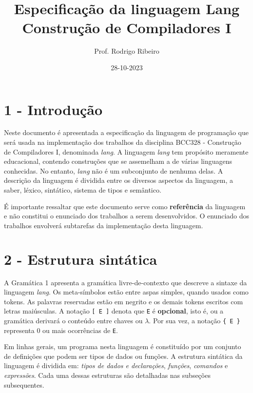 \documentclass[a4paper,11pt]{article}
\author{Prof. Rodrigo Ribeiro}
\date{28-10-2023}
\title{Especificação da linguagem Lang\\\medskip
\large Construção de Compiladores I}
\begin{document}
\maketitle
\newcommand{\lang}{$lang$}
\newcommand{\disciplina}{BCC328 - Construção de Compiladores I}
\section*{1 - Introdução}
\label{sec:orgea41eeb}

Neste documento é apresentada a especificação da linguagem de programação que será usada na
implementação dos trabalhos da disciplina \disciplina, denominada \emph{lang}.
A linguagem \emph{lang} tem
propósito meramente educacional, contendo construções que se assemelham a de várias linguagens
conhecidas. No entanto, \emph{lang} não é um subconjunto de nenhuma delas. A descrição da linguagem é
dividida entre os diversos aspectos da linguagem, a saber, léxico, sintático, sistema de tipos e
semântico.

É importante ressaltar que este documento serve como \textbf{referência} da linguagem e não constitui o
enunciado dos trabalhos a serem desenvolvidos. O enunciado dos trabalhos envolverá subtarefas
da implementação desta linguagem.
\section*{2 - Estrutura sintática}
\label{sec:org98c7b20}

A Gramática 1 apresenta a gramática livre-de-contexto que descreve a sintaxe da linguagem
\emph{lang}. Os meta-símbolos estão entre aspas simples, quando usados como tokens.
As palavras reservadas estão em negrito e os demais tokens escritos com letras maiúsculas. A notação
\texttt{[ E ]} denota que \texttt{E} é \textbf{opcional}, isto é, ou a gramática derivará o conteúdo entre
chaves ou \(\lambda\). Por sua vez, a notação \texttt{\{ E \}} representa 0 ou mais ocorrências de \texttt{E}.

Em linhas gerais, um programa nesta linguagem é constituído por um conjunto de definições que podem ser
tipos de dados ou funções. A estrutura sintática da linguagem é dividida em:
\emph{tipos de dados e declarações}, \emph{funções}, \emph{comandos} e \emph{expressões}.
Cada uma dessas estruturas são detalhadas nas subseções subsequentes.
\end{document}
